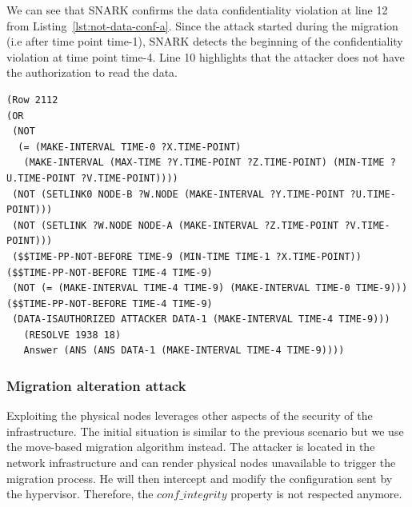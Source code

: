 We can see that SNARK confirms the data confidentiality violation at line 12 from Listing~\ref{lst:not-data-conf-a}.
Since the attack started during the migration (i.e after time point time-1), SNARK detects the beginning of the confidentiality violation at time point time-4.
Line 10 highlights that the attacker does not have the authorization to read the data.

\begin{lstlisting}[caption=SNARK detecting the data confidentiality violation., label=lst:not-data-conf-a,captionpos=b] 
(Row 2112  
(OR
 (NOT
  (= (MAKE-INTERVAL TIME-0 ?X.TIME-POINT)
   (MAKE-INTERVAL (MAX-TIME ?Y.TIME-POINT ?Z.TIME-POINT) (MIN-TIME ?U.TIME-POINT ?V.TIME-POINT))))
 (NOT (SETLINK0 NODE-B ?W.NODE (MAKE-INTERVAL ?Y.TIME-POINT ?U.TIME-POINT)))
 (NOT (SETLINK ?W.NODE NODE-A (MAKE-INTERVAL ?Z.TIME-POINT ?V.TIME-POINT)))
 ($$TIME-PP-NOT-BEFORE TIME-9 (MIN-TIME TIME-1 ?X.TIME-POINT)) ($$TIME-PP-NOT-BEFORE TIME-4 TIME-9)
 (NOT (= (MAKE-INTERVAL TIME-4 TIME-9) (MAKE-INTERVAL TIME-0 TIME-9))) ($$TIME-PP-NOT-BEFORE TIME-4 TIME-9)
 (DATA-ISAUTHORIZED ATTACKER DATA-1 (MAKE-INTERVAL TIME-4 TIME-9)))
   (RESOLVE 1938 18)
   Answer (ANS (ANS DATA-1 (MAKE-INTERVAL TIME-4 TIME-9)))) 
\end{lstlisting}


\subsubsection{Migration alteration attack}
Exploiting the physical nodes leverages other aspects of the security of the infrastructure.
The initial situation is similar to the previous scenario but we use the move-based migration algorithm instead.
The attacker is located in the network infrastructure and can render physical nodes unavailable to trigger the migration process. He will then intercept and modify the configuration sent by the hypervisor. 
Therefore, the $conf\_integrity$ property is not respected anymore.

